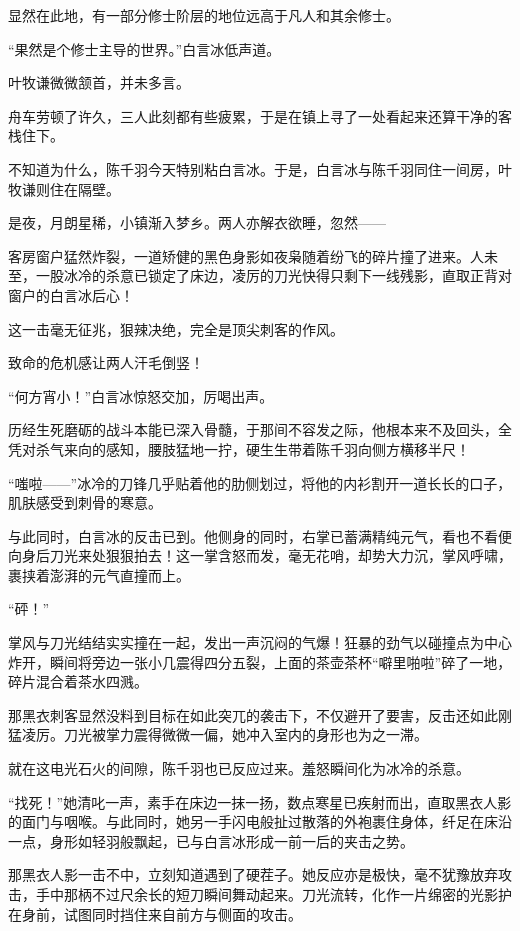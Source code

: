 显然在此地，有一部分修士阶层的地位远高于凡人和其余修士。

“果然是个修士主导的世界。”白言冰低声道。

叶牧谦微微颔首，并未多言。

\vspace{2em}

舟车劳顿了许久，三人此刻都有些疲累，于是在镇上寻了一处看起来还算干净的客栈住下。

不知道为什么，陈千羽今天特别粘白言冰。于是，白言冰与陈千羽同住一间房，叶牧谦则住在隔壁。

是夜，月朗星稀，小镇渐入梦乡。两人亦解衣欲睡，忽然——

客房窗户猛然炸裂，一道矫健的黑色身影如夜枭随着纷飞的碎片撞了进来。人未至，一股冰冷的杀意已锁定了床边，凌厉的刀光快得只剩下一线残影，直取正背对窗户的白言冰后心！

这一击毫无征兆，狠辣决绝，完全是顶尖刺客的作风。

致命的危机感让两人汗毛倒竖！

“何方宵小！”白言冰惊怒交加，厉喝出声。

历经生死磨砺的战斗本能已深入骨髓，于那间不容发之际，他根本来不及回头，全凭对杀气来向的感知，腰肢猛地一拧，硬生生带着陈千羽向侧方横移半尺！

“嗤啦——”冰冷的刀锋几乎贴着他的肋侧划过，将他的内衫割开一道长长的口子，肌肤感受到刺骨的寒意。

与此同时，白言冰的反击已到。他侧身的同时，右掌已蓄满精纯元气，看也不看便向身后刀光来处狠狠拍去！这一掌含怒而发，毫无花哨，却势大力沉，掌风呼啸，裹挟着澎湃的元气直撞而上。

“砰！”

掌风与刀光结结实实撞在一起，发出一声沉闷的气爆！狂暴的劲气以碰撞点为中心炸开，瞬间将旁边一张小几震得四分五裂，上面的茶壶茶杯“噼里啪啦”碎了一地，碎片混合着茶水四溅。

那黑衣刺客显然没料到目标在如此突兀的袭击下，不仅避开了要害，反击还如此刚猛凌厉。刀光被掌力震得微微一偏，她冲入室内的身形也为之一滞。

就在这电光石火的间隙，陈千羽也已反应过来。羞怒瞬间化为冰冷的杀意。

“找死！”她清叱一声，素手在床边一抹一扬，数点寒星已疾射而出，直取黑衣人影的面门与咽喉。与此同时，她另一手闪电般扯过散落的外袍裹住身体，纤足在床沿一点，身形如轻羽般飘起，已与白言冰形成一前一后的夹击之势。

那黑衣人影一击不中，立刻知道遇到了硬茬子。她反应亦是极快，毫不犹豫放弃攻击，手中那柄不过尺余长的短刀瞬间舞动起来。刀光流转，化作一片绵密的光影护在身前，试图同时挡住来自前方与侧面的攻击。

